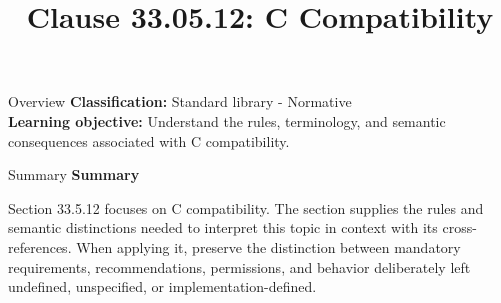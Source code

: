 \documentclass[10pt,letterpaper]{article}
\title{Clause 33.05.12: C Compatibility}
\author{}
\date{}
\begin{document}
\maketitle
\begin{CornellOverviewBox}{Overview}
\textbf{Classification:} Standard library - Normative\\[2pt]
\textbf{Learning objective:} Understand the rules, terminology, and semantic consequences associated with C compatibility.
\end{CornellOverviewBox}\begin{CornellSummaryBox}{Summary}
{\sffamily\bfseries\color{Accent} Summary}\par\vspace{3pt}Section 33.5.12 focuses on C compatibility. The section supplies the rules and semantic distinctions needed to interpret this topic in context with its cross-references. When applying it, preserve the distinction between mandatory requirements, recommendations, permissions, and behavior deliberately left undefined, unspecified, or implementation-defined.
\end{CornellSummaryBox}
\end{document}
